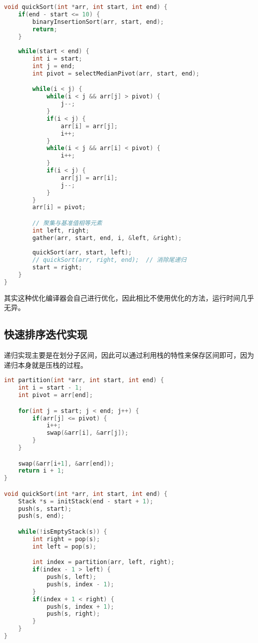 \begin{lstlisting}[language=C]
void quickSort(int *arr, int start, int end) {
    if(end - start <= 10) {
        binaryInsertionSort(arr, start, end);
        return;
    }
    
    while(start < end) {
        int i = start;
        int j = end;
        int pivot = selectMedianPivot(arr, start, end);

        while(i < j) {
            while(i < j && arr[j] > pivot) {
                j--;
            }
            if(i < j) {
                arr[i] = arr[j];
                i++;
            }
            while(i < j && arr[i] < pivot) {
                i++;
            }
            if(i < j) {
                arr[j] = arr[i];
                j--;
            }
        }
        arr[i] = pivot;

        // 聚集与基准值相等元素
        int left, right;
        gather(arr, start, end, i, &left, &right);
        
        quickSort(arr, start, left);
        // quickSort(arr, right, end);  // 消除尾递归
        start = right;
    }
}
\end{lstlisting}

其实这种优化编译器会自己进行优化，因此相比不使用优化的方法，运行时间几乎无异。\\

\subsection{快速排序迭代实现}

递归实现主要是在划分子区间，因此可以通过利用栈的特性来保存区间即可，因为递归本身就是压栈的过程。\\


\begin{lstlisting}[language=C]
int partition(int *arr, int start, int end) {
    int i = start - 1;
    int pivot = arr[end];

    for(int j = start; j < end; j++) {
        if(arr[j] <= pivot) {
            i++;
            swap(&arr[i], &arr[j]);
        }
    }

    swap(&arr[i+1], &arr[end]);
    return i + 1;
}

void quickSort(int *arr, int start, int end) {
    Stack *s = initStack(end - start + 1);
    push(s, start);
    push(s, end);

    while(!isEmptyStack(s)) {
        int right = pop(s);
        int left = pop(s);

        int index = partition(arr, left, right);
        if(index - 1 > left) {
            push(s, left);
            push(s, index - 1);
        }
        if(index + 1 < right) {
            push(s, index + 1);
            push(s, right);
        }
    }
}
\end{lstlisting}

